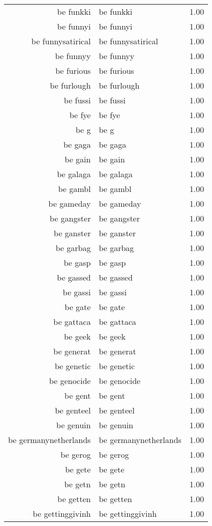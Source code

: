 \begin{table}[ht]
\begin{tabular}{rlr}
  be funkki & be funkki & 1.00 \\ 
  be funnyi & be funnyi & 1.00 \\ 
  be funnysatirical & be funnysatirical & 1.00 \\ 
  be funnyy & be funnyy & 1.00 \\ 
  be furious & be furious & 1.00 \\ 
  be furlough & be furlough & 1.00 \\ 
  be fussi & be fussi & 1.00 \\ 
  be fye & be fye & 1.00 \\ 
  be g & be g & 1.00 \\ 
  be gaga & be gaga & 1.00 \\ 
  be gain & be gain & 1.00 \\ 
  be galaga & be galaga & 1.00 \\ 
  be gambl & be gambl & 1.00 \\ 
  be gameday & be gameday & 1.00 \\ 
  be gangster & be gangster & 1.00 \\ 
  be ganster & be ganster & 1.00 \\ 
  be garbag & be garbag & 1.00 \\ 
  be gasp & be gasp & 1.00 \\ 
  be gassed & be gassed & 1.00 \\ 
  be gassi & be gassi & 1.00 \\ 
  be gate & be gate & 1.00 \\ 
  be gattaca & be gattaca & 1.00 \\ 
  be geek & be geek & 1.00 \\ 
  be generat & be generat & 1.00 \\ 
  be genetic & be genetic & 1.00 \\ 
  be genocide & be genocide & 1.00 \\ 
  be gent & be gent & 1.00 \\ 
  be genteel & be genteel & 1.00 \\ 
  be genuin & be genuin & 1.00 \\ 
  be germanynetherlands & be germanynetherlands & 1.00 \\ 
  be gerog & be gerog & 1.00 \\ 
  be gete & be gete & 1.00 \\ 
  be getn & be getn & 1.00 \\ 
  be getten & be getten & 1.00 \\ 
  be gettinggivinh & be gettinggivinh & 1.00 \\ 

\end{tabular}
\end{table}
